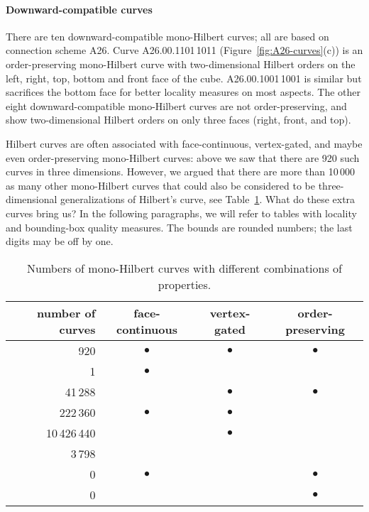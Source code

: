 \documentclass[11pt,a4paper]{article}
\begin{document}
\paragraph{Downward-compatible curves}
There are ten downward-compatible mono-Hilbert curves; all are based on connection scheme A26.
Curve A26.00.1101\,1011 (Figure~\ref{fig:A26-curves}(c)) is an order-preserving mono-Hilbert curve with two-dimensional Hilbert orders on the left, right, top, bottom and front face of the cube.
A26.00.1001\,1001 is similar but sacrifices the bottom face for better locality measures on most aspects.
The other eight downward-compatible mono-Hilbert curves are not order-preserving, and show two-dimensional Hilbert orders on only three faces (right, front, and top).



\bigskip
Hilbert curves are often associated with face-continuous, vertex-gated, and maybe even order-preserving mono-Hilbert curves: above we saw that there are 920 such curves in three dimensions. However, we argued that there are more than 10\,000 as many other mono-Hilbert curves that could also be considered to be three-dimensional generalizations of Hilbert's curve, see Table~\ref{tab:extracurves}.
What do these extra curves bring us? In the following paragraphs, we will refer to tables with locality and bounding-box quality measures. The bounds are rounded numbers; the last digits may be off by one.

\begin{table}
\centering
\begin{tabular}{r|ccc}
number of curves & face-continuous & vertex-gated & order-preserving \\
\hline
             920 &   $\bullet$     &   $\bullet$  &    $\bullet$     \\
               1 &   $\bullet$     &              &                  \\
         41\,288 &                 &   $\bullet$  &    $\bullet$     \\
\hline
        222\,360 &   $\bullet$     &   $\bullet$  &                  \\
    10\,426\,440 &                 &   $\bullet$  &                  \\
          3\,798 &                 &              &                  \\
\hline
               0 &   $\bullet$     &              &    $\bullet$     \\
               0 &                 &              &    $\bullet$     \\
\end{tabular}
\caption{Numbers of mono-Hilbert curves with different combinations of properties.}
\label{tab:extracurves}
\end{table}
\end{document}
